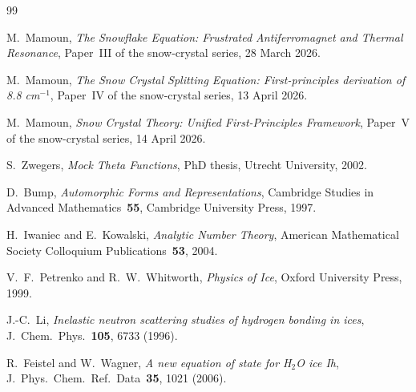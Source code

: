 \documentclass[11pt,letterpaper]{article}
\theoremstyle{plain}
\theoremstyle{definition}
\begin{document}
\begin{thebibliography}{99}

 M.~Mamoun,
\emph{The Snowflake Equation: Frustrated Antiferromagnet and
Thermal Resonance}, Paper~III of the snow-crystal series, 28 March
2026.

 M.~Mamoun,
\emph{The Snow Crystal Splitting Equation: First-principles
derivation of 8.8 cm$^{-1}$},
Paper~IV of the snow-crystal series,
13 April 2026.

 M.~Mamoun,
\emph{Snow Crystal Theory: Unified First-Principles Framework},
Paper~V of the snow-crystal series, 14 April 2026.

 S.~Zwegers,
\emph{Mock Theta Functions}, PhD thesis, Utrecht University, 2002.

 D.~Bump,
\emph{Automorphic Forms and Representations}, Cambridge Studies in
Advanced Mathematics~{\bf 55}, Cambridge University Press, 1997.

 H.~Iwaniec and E.~Kowalski,
\emph{Analytic Number Theory}, American Mathematical Society
Colloquium Publications~{\bf 53}, 2004.

 V.~F.~Petrenko and R.~W.~Whitworth,
\emph{Physics of Ice}, Oxford University Press, 1999.

 J.-C.~Li,
\emph{Inelastic neutron scattering studies of hydrogen bonding in
ices}, J.~Chem.~Phys.~{\bf 105}, 6733 (1996).

 R.~Feistel and W.~Wagner,
\emph{A new equation of state for H$_2$O ice Ih},
J.~Phys.~Chem.~Ref.~Data~{\bf 35}, 1021 (2006).

\end{thebibliography}
\end{document}
